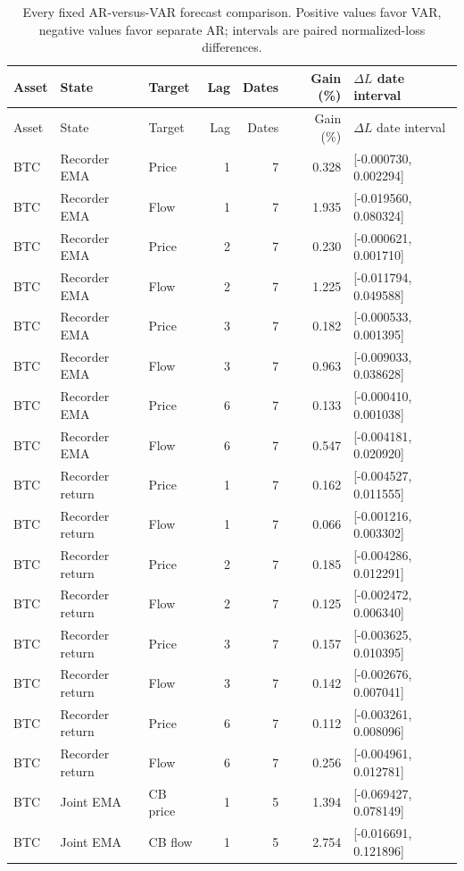 \begin{longtable}{lllrrrl}
\caption{Every fixed AR-versus-VAR forecast comparison. Positive values favor VAR, negative values favor separate AR; intervals are paired normalized-loss differences.}\label{tab:forecast_audit_complete}\\
\toprule Asset & State & Target & Lag & Dates & Gain (\%) & $\Delta L$ date interval\\\midrule\endfirsthead
\toprule Asset & State & Target & Lag & Dates & Gain (\%) & $\Delta L$ date interval\\\midrule\endhead
\bottomrule\endfoot
BTC & Recorder EMA & Price & 1 & 7 & 0.328 & [-0.000730, 0.002294]\\
BTC & Recorder EMA & Flow & 1 & 7 & 1.935 & [-0.019560, 0.080324]\\
BTC & Recorder EMA & Price & 2 & 7 & 0.230 & [-0.000621, 0.001710]\\
BTC & Recorder EMA & Flow & 2 & 7 & 1.225 & [-0.011794, 0.049588]\\
BTC & Recorder EMA & Price & 3 & 7 & 0.182 & [-0.000533, 0.001395]\\
BTC & Recorder EMA & Flow & 3 & 7 & 0.963 & [-0.009033, 0.038628]\\
BTC & Recorder EMA & Price & 6 & 7 & 0.133 & [-0.000410, 0.001038]\\
BTC & Recorder EMA & Flow & 6 & 7 & 0.547 & [-0.004181, 0.020920]\\
BTC & Recorder return & Price & 1 & 7 & 0.162 & [-0.004527, 0.011555]\\
BTC & Recorder return & Flow & 1 & 7 & 0.066 & [-0.001216, 0.003302]\\
BTC & Recorder return & Price & 2 & 7 & 0.185 & [-0.004286, 0.012291]\\
BTC & Recorder return & Flow & 2 & 7 & 0.125 & [-0.002472, 0.006340]\\
BTC & Recorder return & Price & 3 & 7 & 0.157 & [-0.003625, 0.010395]\\
BTC & Recorder return & Flow & 3 & 7 & 0.142 & [-0.002676, 0.007041]\\
BTC & Recorder return & Price & 6 & 7 & 0.112 & [-0.003261, 0.008096]\\
BTC & Recorder return & Flow & 6 & 7 & 0.256 & [-0.004961, 0.012781]\\
BTC & Joint EMA & CB price & 1 & 5 & 1.394 & [-0.069427, 0.078149]\\
BTC & Joint EMA & CB flow & 1 & 5 & 2.754 & [-0.016691, 0.121896]\\

\end{longtable}
